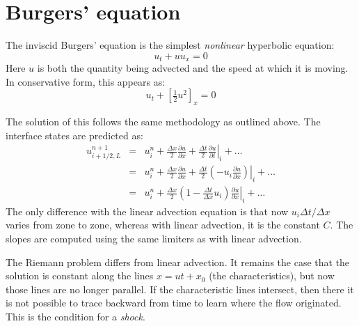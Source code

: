 
\begin{quote}
\end{quote}


\section{Burgers' equation}

The inviscid Burgers' equation is the simplest {\em nonlinear} hyperbolic
equation:
\begin{equation}
u_t + u u_x = 0
\end{equation}
Here $u$ is both the quantity being advected and the speed at which 
it is moving.
In conservative form, this appears as:
\begin{equation}
u_t + \left [\tfrac{1}{2} u^2 \right ]_x = 0
\end{equation}

The solution of this follows the same methodology as outlined above.
The interface states are predicted as:
\begin{eqnarray}
u^{n+1}_{i+1/2,L} 
 &=& u^n_i + \frac{\Delta x}{2} \frac{\partial u}{\partial x}
    + \frac{\Delta t}{2} \left . \frac{\partial u}{\partial t} \right |_i
    + \ldots \\
 &=& u^n_i + \frac{\Delta x}{2} \frac{\partial u}{\partial x}
    + \frac{\Delta t}{2} \left . \left (-u_i \frac{\partial u}{\partial x} 
         \right ) \right |_i 
    + \ldots \\
 &=& u^n_i + \frac{\Delta x}{2} 
   \left ( 1 - \frac{\Delta t}{\Delta x} u_i \right ) 
   \left . \frac{\partial u}{\partial x} \right |_i + \ldots
\end{eqnarray}
The only difference with the linear advection equation is that now
$u_i \Delta t/\Delta x$ varies from zone to zone, whereas with linear
advection, it is the constant $C$.  The slopes are computed using
the same limiters as with linear advection.

The Riemann problem differs from linear advection.  It remains the
case that the solution is constant along the lines $x = ut + x_0$ (the
characteristics), but now those lines are no longer parallel.  If the
characteristic lines intersect, then there it is not possible to trace
backward from time to learn where the flow originated.  This is the 
condition for a {\em shock}.

